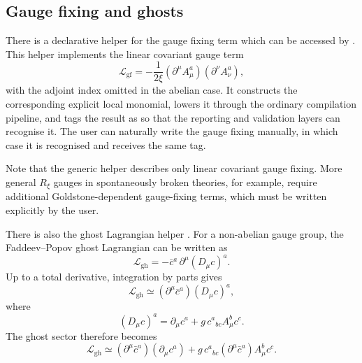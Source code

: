 \subsection{Gauge fixing and ghosts}

There is a declarative helper for the gauge fixing term which can be accessed by . This helper implements the linear covariant gauge term
\begin{equation}
    \mathcal{L}_{\mathrm{gf}}
    =
    -\frac{1}{2\xi}
    \left(\partial^\mu A^a_\mu\right)
    \left(\partial^\nu A^a_\nu\right),
\end{equation}
with the adjoint index omitted in the abelian case. It constructs the corresponding explicit local monomial, lowers it through the ordinary compilation pipeline, and tags the result as  so that the reporting and validation layers can recognise it. The user can naturally write the gauge fixing manually, in which case it is recognised and receives the same tag.

Note that the generic  helper describes only linear covariant gauge fixing. More general $R_\xi$ gauges in spontaneously broken theories, for example, require additional Goldstone-dependent gauge-fixing terms, which must be written explicitly by the user.

There is also the ghost Lagrangian helper . For a non-abelian gauge group, the Faddeev--Popov ghost Lagrangian can be written as
\begin{equation}
    \mathcal{L}_{\mathrm{gh}}
    =
    -\bar c^a\,
    \partial^\mu\left(D_\mu c\right)^a.
\end{equation}
Up to a total derivative, integration by parts gives
\begin{equation}
    \mathcal{L}_{\mathrm{gh}}
    \simeq
    \left(\partial^\mu\bar c^a\right)
    \left(D_\mu c\right)^a,
\end{equation}
where
\begin{equation}
    \left(D_\mu c\right)^a
    =
    \partial_\mu c^a
    +
    g\,c^{a}{}_{bc}A^b_\mu c^c.
\end{equation}
The ghost sector therefore becomes
\begin{equation}
    \mathcal{L}_{\mathrm{gh}}
    \simeq
    \left(\partial^\mu\bar c^a\right)
    \left(\partial_\mu c^a\right)
    +
    g\,c^{a}{}_{bc}
    \left(\partial^\mu\bar c^a\right)
    A^b_\mu c^c.
\end{equation}

